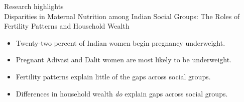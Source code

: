 \documentclass[12pt]{article}
\begin{document}
\RaggedRight

 
{\LARGE{Research highlights}}
\vspace{1cm}
\\
{\Large{Disparities in Maternal Nutrition among Indian Social Groups: The Roles of Fertility Patterns and Household Wealth} }


{
\begin{itemize}
    \item Twenty-two percent of Indian women begin pregnancy underweight.
    \item Pregnant Adivasi and Dalit women are most likely to be underweight.
    \item Fertility patterns explain little of the gaps across social groups.
    \item Differences in household wealth \emph{do} explain gaps across social groups.
\end{itemize}
}
\newpage
\doublespacing
\end{document}
